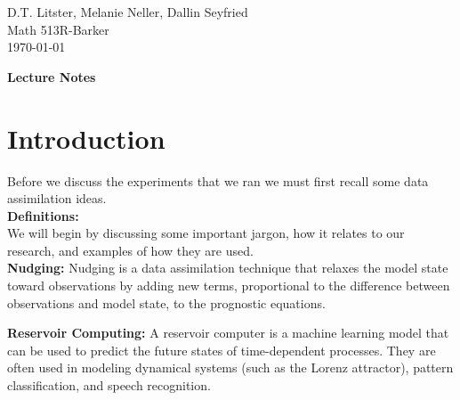 \documentclass[12pt,oneside]{article}
\newcommand{\defEx}[2]{\textbf{#1} #2}
\theoremstyle{plain}
\newtheorem{example}{Example}
\begin{document}
\begin{flushright}
\normalsize{D.T. Litster, Melanie Neller, Dallin Seyfried}  \\
Math 513R-Barker\\
\today
\end{flushright}

\begin{center}
\LARGE \textbf{Lecture Notes} \\
\end{center}

\section{Introduction}

\noindent\normalsize{Before we discuss the experiments that we ran we must first recall some data assimilation ideas.}\\


\noindent\large\textbf{Definitions:}\\
\noindent\normalsize{We will begin by discussing some important jargon, how it relates to our research, and examples of how they are used.}\\ 



\defEx{Nudging:}
{Nudging is a data assimilation technique that relaxes the model state toward observations by adding new terms, proportional to the difference between observations and model state, to the prognostic equations.}

\defEx{Reservoir Computing:}
{A reservoir computer is a machine learning model that can be used to predict the future states of time-dependent processes.  They are often used in modeling dynamical systems (such as the Lorenz attractor), pattern classification, and speech recognition.}
\end{document}
